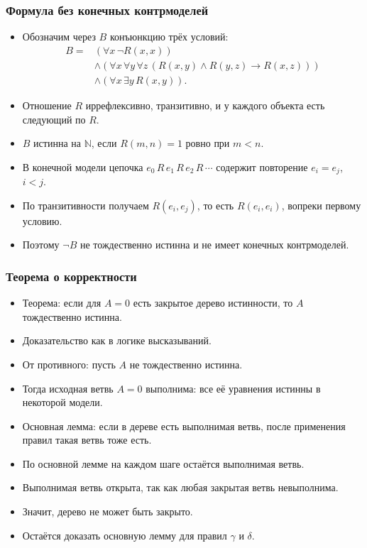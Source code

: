 \documentclass[10pt]{beamer}
\begin{document}
\begin{frame}
\begin{framefont}{\small}
\frametitle{Формула без конечных контрмоделей}
\begin{itemize}
    \item Обозначим через $B$ конъюнкцию трёх условий:
    \[
    \begin{aligned}
        B={}&(\forall x\,\neg R(x,x))\\
            &\land(\forall x\,\forall y\,\forall z\,(R(x,y)\land R(y,z)\to R(x,z)))\\
            &\land(\forall x\,\exists y\,R(x,y)).
    \end{aligned}
    \]
    \item Отношение $R$ иррефлексивно, транзитивно, и у каждого объекта есть следующий по $R$.
    \pause
    \item $B$ истинна на $\mathbb N$, если \pause $R(m,n)=1$ ровно при $m<n$.
    \pause
    \item В конечной модели цепочка $e_0\,R\,e_1\,R\,e_2\,R\,\cdots$ содержит повторение $e_i=e_j$, $i<j$.
    \item По транзитивности получаем $R(e_i,e_j)$, то есть $R(e_i,e_i)$, вопреки первому условию.
    \pause
    \item Поэтому $\neg B$ не тождественно истинна и не имеет конечных контрмоделей.
\end{itemize}
\end{framefont}
\end{frame}

\begin{frame}
    \frametitle{Теорема о корректности}
    \begin{itemize}
        \item Теорема: если для $A=0$ есть закрытое дерево истинности, то $A$ тождественно истинна.
        \item Доказательство как в логике высказываний.
        \pause
        \item От противного: пусть $A$ не тождественно истинна.
        \item Тогда исходная ветвь $A=0$ выполнима: все её уравнения истинны в некоторой модели.
        \item Основная лемма: если в дереве есть выполнимая ветвь, после применения правил такая ветвь тоже есть.
        \item По основной лемме на каждом шаге остаётся выполнимая ветвь.
        \item Выполнимая ветвь открыта, так как любая закрытая ветвь невыполнима.
        \item Значит, дерево не может быть закрыто.
        \pause
        \item Остаётся доказать основную лемму для правил $\gamma$ и $\delta$.
    \end{itemize}
\end{frame}
\end{document}
